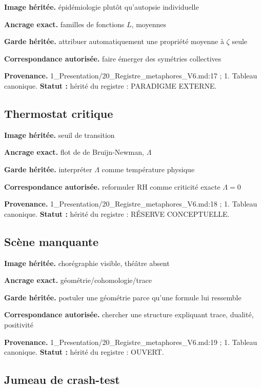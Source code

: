 \documentclass[
  9pt,
  a4paper,
]{article}
\begin{document}
\textbf{Image héritée.} épidémiologie plutôt qu'autopsie individuelle

\textbf{Ancrage exact.} familles de fonctions \(L\), moyennes

\textbf{Garde héritée.} attribuer automatiquement une propriété moyenne
à \(\zeta\) seule

\textbf{Correspondance autorisée.} faire émerger des symétries
collectives

\textbf{Provenance.} 1\_Presentation/20\_Registre\_metaphores\_V6.md:17
; 1. Tableau canonique. \textbf{Statut :} hérité du registre : PARADIGME
EXTERNE.

\hypertarget{thermostat-critique}{%
\subsection{Thermostat critique}\label{thermostat-critique}}

\textbf{Image héritée.} seuil de transition

\textbf{Ancrage exact.} flot de de Bruijn-Newman, \(\Lambda\)

\textbf{Garde héritée.} interpréter \(\Lambda\) comme température
physique

\textbf{Correspondance autorisée.} reformuler RH comme criticité exacte
\(\Lambda=0\)

\textbf{Provenance.} 1\_Presentation/20\_Registre\_metaphores\_V6.md:18
; 1. Tableau canonique. \textbf{Statut :} hérité du registre : RÉSERVE
CONCEPTUELLE.

\hypertarget{scuxe8ne-manquante}{%
\subsection{Scène manquante}\label{scuxe8ne-manquante}}

\textbf{Image héritée.} chorégraphie visible, théâtre absent

\textbf{Ancrage exact.} géométrie/cohomologie/trace

\textbf{Garde héritée.} postuler une géométrie parce qu'une formule lui
ressemble

\textbf{Correspondance autorisée.} chercher une structure expliquant
trace, dualité, positivité

\textbf{Provenance.} 1\_Presentation/20\_Registre\_metaphores\_V6.md:19
; 1. Tableau canonique. \textbf{Statut :} hérité du registre : OUVERT.

\hypertarget{jumeau-de-crash-test}{%
\subsection{Jumeau de crash-test}\label{jumeau-de-crash-test}}
\end{document}
